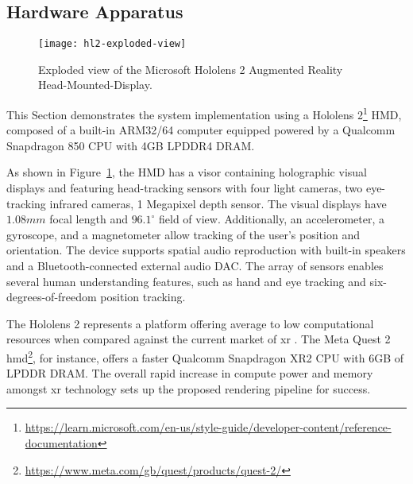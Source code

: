 \subsection{Hardware Apparatus}
\begin{figure}[htbp]
    \centering
    \texttt{[image: hl2-exploded-view]}
    \caption{Exploded view of the Microsoft Hololens 2 Augmented Reality Head-Mounted-Display.}\label{fig:hl2-exploded-view}
\end{figure}
This Section demonstrates the system implementation using a Hololens 2\footnote{\href{learn.microsoft.com/en-us/style-guide/developer-content/reference-documentation}{https://learn.microsoft.com/en-us/style-guide/developer-content/reference-documentation}} HMD, composed of a built-in ARM32/64 computer equipped powered by a Qualcomm Snapdragon 850 CPU with 4GB LPDDR4 DRAM.\par
As shown in Figure~\ref{fig:hl2-exploded-view}, the HMD has a visor containing holographic visual displays and featuring head-tracking sensors with four light cameras, two eye-tracking infrared cameras, 1 Megapixel depth sensor. The visual displays have $1.08mm$ focal length and $96.1^\circ$ field of view. Additionally, an accelerometer, a gyroscope, and a magnetometer allow tracking of the user's position and orientation. The device supports spatial audio reproduction with built-in speakers and a Bluetooth-connected external audio DAC. The array of sensors enables several human understanding features, such as hand and eye tracking and six-degrees-of-freedom position tracking.\par
The Hololens 2 represents a platform offering average to low computational resources when compared against the current market of \acrshort{xr} . The Meta Quest 2 \acrshort{hmd}\footnote{\url{https://www.meta.com/gb/quest/products/quest-2/}}, for instance, offers a faster Qualcomm Snapdragon XR2 CPU with 6GB of LPDDR DRAM. The overall rapid increase in compute power and memory amongst \acrshort{xr} technology sets up the proposed rendering pipeline for success.

